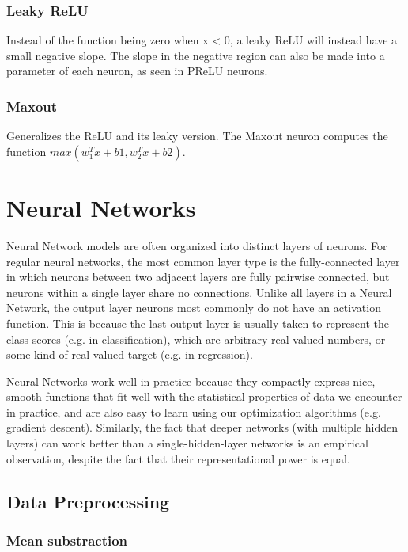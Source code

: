 \documentclass[letterpaper]{article}
\begin{document}
\subsubsection{Leaky ReLU}

Instead of the function being zero when x < 0, a leaky ReLU will instead have a small negative slope. The slope in the negative region can also be made into a parameter of each neuron, as seen in PReLU neurons. 

\subsubsection{Maxout} 

Generalizes the ReLU and its leaky version. The Maxout neuron computes the function \(max(w^T_1x+b1,w^T_2x+b2)\).

\section{Neural Networks}

Neural Network models are often organized into distinct layers of neurons. For regular neural networks, the most common layer type is the fully-connected layer in which neurons between two adjacent layers are fully pairwise connected, but neurons within a single layer share no connections. Unlike all layers in a Neural Network, the output layer neurons most commonly do not have an activation function. This is because the last output layer is usually taken to represent the class scores (e.g. in classification), which are arbitrary real-valued numbers, or some kind of real-valued target (e.g. in regression).

Neural Networks work well in practice because they compactly express nice, smooth functions that fit well with the statistical properties of data we encounter in practice, and are also easy to learn using our optimization algorithms (e.g. gradient descent). Similarly, the fact that deeper networks (with multiple hidden layers) can work better than a single-hidden-layer networks is an empirical observation, despite the fact that their representational power is equal.

\subsection{Data Preprocessing}

\subsubsection{Mean substraction}
\end{document}
